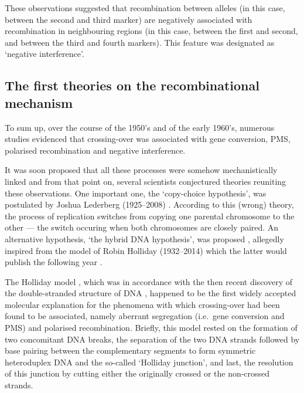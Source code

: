 These observations suggested that recombination between alleles (in this case, between the second and third marker) are negatively associated with recombination in neighbouring regions (in this case, between the first and second, and between the third and fourth markers). This feature was designated as ‘negative interference’.







\subsection{The first theories on the recombinational mechanism}


To sum up, over the course of the 1950's and of the early 1960's, numerous studies evidenced that crossing-over was associated with gene conversion, PMS, polarised recombination and negative interference.

It was soon proposed that all these processes were somehow mechanistically linked \citep{perkins1962frequency} and from that point on, several scientists conjectured theories reuniting these observations.
One important one, the ‘copy-choice hypothesis’, was postulated by Joshua Lederberg (1925--2008) \citep{lederberg1955recombination}. According to this (wrong) theory, the process of replication switches from copying one parental chromosome to the other — the switch occuring when both chromosomes are closely paired.
An alternative hypothesis, ‘the hybrid DNA hypothesis’, was proposed \citep{whitehouse1963theory}, allegedly inspired from the model of Robin Holliday (1932--2014) \citep{holliday2011recombination} which the latter would publish the following year \citep{holliday1964mechanism}.

The Holliday model \citep{holliday1964mechanism,holliday1968genetic}, which was in accordance with the then recent discovery of the double-stranded structure of DNA \citep{franklin1953molecular,watson1953molecular,wilkins1953molecular}, happened to be the first widely accepted molecular explanation for the phenomena with which crossing-over had been found to be associated, namely aberrant segregation (i.e.\ gene conversion and PMS) and polarised recombination. 
Briefly, this model rested on the formation of two concomitant DNA breaks, the separation of the two DNA strands followed by base pairing between the complementary segments to form symmetric heteroduplex DNA and the so-called ‘Holliday junction’, and last, the resolution of this junction by cutting either the originally crossed or the non-crossed strands.

